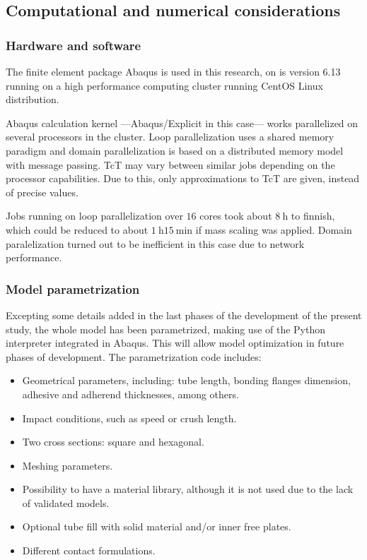 \documentclass[cmfonts]{witpress}
\begin{document}
\subsection{Computational and numerical considerations}

\subsubsection{Hardware and software}

The finite element package Abaqus is used in this research, on is version 6.13 \cite{Abaqus613Manual} running on a high performance computing cluster running CentOS Linux distribution.

Abaqus calculation kernel ---Abaqus/Explicit in this case--- works parallelized on several processors in the cluster. Loop parallelization uses a shared memory paradigm and domain parallelization is based on a distributed memory model with message passing. TcT may vary between similar jobs depending on the processor capabilities. Due to this, only approximations to TcT are given, instead of precise values.

Jobs running on loop parallelization over $16$ cores took about $\SI{8}{\hour}$ to finnish, which could be reduced to about $\SI{1}{\hour}$$\SI{15}{\minute}$ if mass scaling was applied. Domain paralelization turned out to be inefficient in this case due to network performance.


\subsubsection{Model parametrization}
\label{sec:script}

Excepting some details added in the last phases of the development of the present study, the whole model has been parametrized, making use of the Python interpreter integrated in Abaqus. This will allow model optimization in future phases of development. The parametrization code includes:

\begin{itemize}
	\item Geometrical parameters, including: tube length, bonding flanges dimension, adhesive and adherend thicknesses, among others.

	\item Impact conditions, such as speed or crush length.

	\item Two cross sections: square and hexagonal.

	\item Meshing parameters.

	\item Possibility to have a material library, although it is not used due to the lack of validated models.

	\item Optional tube fill with solid material and/or inner free plates.

	\item Different contact formulations.
\end{itemize}
\end{document}
